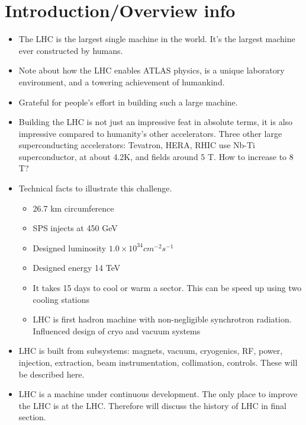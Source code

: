 \section{Introduction/Overview info}
\begin{itemize}
    \item The LHC is the largest single machine in the world. It's the largest machine ever constructed by humans.
    \item Note about how the LHC enables ATLAS physics, is a unique laboratory environment, and a towering achievement of humankind.
    \item Grateful for people's effort in building such a large machine.
    \item Building the LHC is not just an impressive feat in absolute terms, it is also impressive compared to humanity's other accelerators. Three other large superconducting accelerators: Tevatron, HERA, RHIC use Nb-Ti superconductor, at about 4.2K, and fields around 5 T. How to increase to 8 T? \cite{lyndon}
    \item Technical facts to illustrate this challenge.
    \begin{itemize}
        \item 26.7 km circumference
        \item SPS injects at 450 GeV \cite{lyndon}
        \item Designed luminosity $1.0\times10^{34}cm^{-2}s^{-1}$ \cite{lyndon}
        \item Designed energy 14 TeV \cite{lyndon}
        \item It takes 15 days to cool or warm a sector. This can be speed up using two cooling stations \cite{lyndon}
        \item LHC is first hadron machine with non-negligible synchrotron radiation. Influenced design of cryo and vacuum systems \cite{lyndon}
    \end{itemize}
    \item LHC is built from subsystems: magnets, vacuum, cryogenics, RF, power, injection, extraction, beam instrumentation, collimation, controls. \cite{lyndon} These will be described here.
    \item LHC is a machine under continuous development. The only place to improve the LHC is at the LHC. Therefore will discuss the history of LHC in final section.
\end{itemize}

